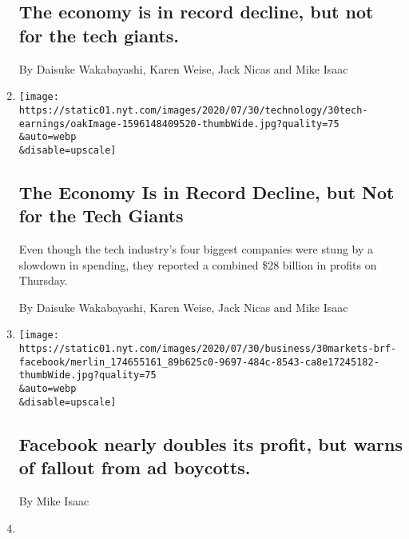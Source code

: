 \begin{enumerate}
{  \subsection{The economy is in record decline, but not for the tech
  giants.}\label{the-economy-is-in-record-decline-but-not-for-the-tech-giants}}

  By Daisuke Wakabayashi, Karen Weise, Jack Nicas and Mike Isaac
\item
  \href{/2020/07/30/technology/tech-company-earnings-amazon-apple-facebook-google.html}{}

  \texttt{[image: https://static01.nyt.com/images/2020/07/30/technology/30tech-earnings/oakImage-1596148409520-thumbWide.jpg?quality=75\\\&auto=webp\\\&disable=upscale]}

  \hypertarget{the-economy-is-in-record-decline-but-not-for-the-tech-giants-1}{%
  \subsection{The Economy Is in Record Decline, but Not for the Tech
  Giants}\label{the-economy-is-in-record-decline-but-not-for-the-tech-giants-1}}

  Even though the tech industry's four biggest companies were stung by a
  slowdown in spending, they reported a combined \$28 billion in profits
  on Thursday.

  By Daisuke Wakabayashi, Karen Weise, Jack Nicas and Mike Isaac
\item
  \href{/live/2020/07/30/business/stock-market-today-coronavirus/facebook-nearly-doubles-its-profit-but-warns-of-fallout-from-ad-boycotts}{}

  \texttt{[image: https://static01.nyt.com/images/2020/07/30/business/30markets-brf-facebook/merlin\_174655161\_89b625c0-9697-484c-8543-ca8e17245182-thumbWide.jpg?quality=75\\\&auto=webp\\\&disable=upscale]}

  \hypertarget{facebook-nearly-doubles-its-profit-but-warns-of-fallout-from-ad-boycotts}{%
  \subsection{Facebook nearly doubles its profit, but warns of fallout
  from ad
  boycotts.}\label{facebook-nearly-doubles-its-profit-but-warns-of-fallout-from-ad-boycotts}}

  By Mike Isaac
\item
  \href{/live/2020/07/29/technology/tech-ceos-hearing-testimony/tech-executives-looked-like-they-work-in-well-tech-offices}{}


\end{enumerate}
